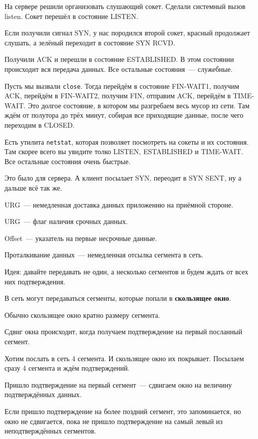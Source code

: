 На сервере решили организовать слушающий сокет. Сделали системный вызов listen. Сокет перешёл в состояние LISTEN.

Если получили сигнал SYN, у нас породился второй сокет, красный продолжает слушать, а зелёный переходит в состояние SYN RCVD.

Получили ACK и перешли в состояние ESTABLISHED. В этом состоянии происходит вся передача данных. Все остальные состояния~--- служебные.

Пусть мы вызвали {\tt close}. Тогда перейдём в состояние FIN-WAIT1, получим ACK, перейдём в FIN-WAIT2, получим FIN, отправим ACK, перейдём в TIME-WAIT. Это долгое состояние, в котором мы разгребаем весь мусор из сети. Там ждём от полутора до трёх минут, собирая все приходящие данные, после чего переходим в CLOSED.

Есть утилита {\tt netstat}, которая позволяет посмотреть на сокеты и их состояния. Там скорее всего вы увидите толко LISTEN, ESTABLISHED и TIME-WAIT. Все остальные состояния очень быстрые.

Это было для сервера. А клиент посылает SYN, переодит в SYN SENT, ну а дальше всё так же.


URG~--- немедленная доставка данных приложению на приёмной стороне.

URG~--- флаг наличия срочных данных.

Offset~--- указатель на первые несрочные данные.

Проталкивание данных~--- немедленная отсылка сегмента в сеть. 


Идея: давайте передавать не один, а несколько сегментов и будем ждать от всех них подтверждения.

В сеть могут передаваться сегменты, которые попали в {\bf скользящее окно}.

Обычно скользящее окно кратно размеру сегмента.

Сдвиг окна происходит, когда получаем подтверждение на первый посланный сегмент.

Хотим послать в сеть 4 сегмента. И скользящее окно их покрывает. Посылаем сразу 4 сегмента и ждём подтверждений. 

Пришло подтверждение на первый сегмент~--- сдвигаем окно на величину подтверждённых данных.

Если пришло подтверждение на более поздний сегмент, это запоминается, но окно не сдвигается, пока не пришло подтверждение на самый левый из неподтверждённых сегментов.

